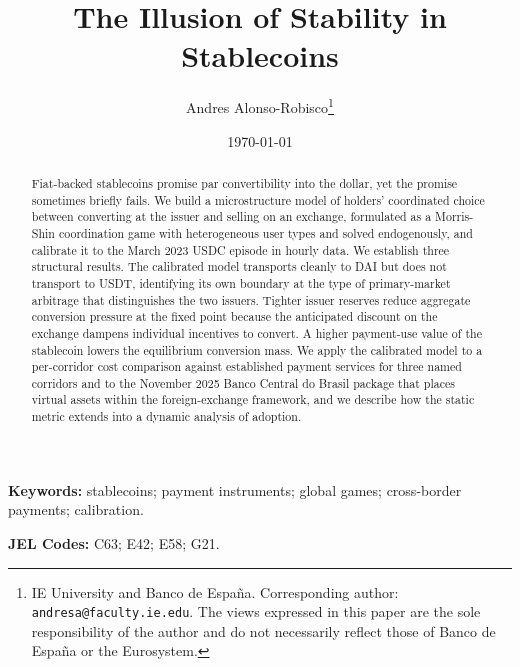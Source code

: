 \documentclass[12pt]{article}
\title{The Illusion of Stability in Stablecoins}
\author{
Andres Alonso-Robisco\thanks{IE University and Banco de Espa\~na.
Corresponding author: \texttt{andresa@faculty.ie.edu}.
The views expressed in this paper are the sole responsibility of the
author and do not necessarily reflect those of Banco de Espa\~na or
the Eurosystem.}
}
\date{\today}
\begin{document}
\maketitle
\onehalfspacing

\begin{abstract}
Fiat-backed stablecoins promise par convertibility into the dollar, yet the promise sometimes briefly fails. We build a microstructure model of holders' coordinated choice between converting at the issuer and selling on an exchange, formulated as a Morris-Shin coordination game with heterogeneous user types and solved endogenously, and calibrate it to the March 2023 USDC episode in hourly data. We establish three structural results. The calibrated model transports cleanly to DAI but does not transport to USDT, identifying its own boundary at the type of primary-market arbitrage that distinguishes the two issuers. Tighter issuer reserves reduce aggregate conversion pressure at the fixed point because the anticipated discount on the exchange dampens individual incentives to convert. A higher payment-use value of the stablecoin lowers the equilibrium conversion mass. We apply the calibrated model to a per-corridor cost comparison against established payment services for three named corridors and to the November 2025 Banco Central do Brasil package that places virtual assets within the foreign-exchange framework, and we describe how the static metric extends into a dynamic analysis of adoption.
\end{abstract}

\noindent\textbf{Keywords:} stablecoins; payment instruments; global games; cross-border payments; calibration.

\noindent\textbf{JEL Codes:} C63; E42; E58; G21.

\clearpage










\clearpage



\clearpage
\appendix



\end{document}
